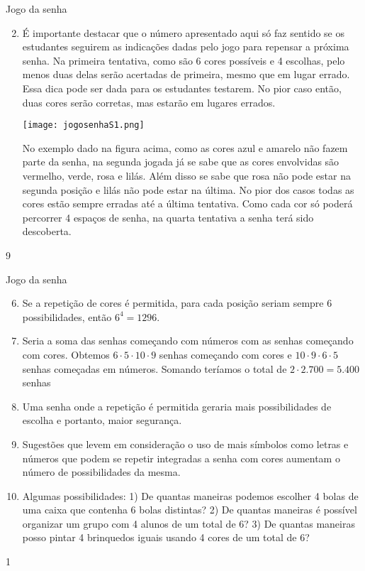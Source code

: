 \begin{answer}{Jogo da senha}
{
\begin{enumerate}\setcounter{enumi}{1}
\item É importante destacar que o número apresentado aqui só faz sentido se os estudantes seguirem as indicações dadas pelo jogo para repensar a próxima senha. 
Na primeira tentativa, como são 6 cores possíveis e 4 escolhas, pelo menos duas delas serão acertadas de primeira, mesmo que em lugar errado. Essa dica pode ser dada para os estudantes testarem. No pior caso então, duas cores serão corretas, mas estarão em lugares errados.

\begin{center}
\texttt{[image: jogosenhaS1.png]}
\end{center}
No exemplo dado na figura acima, como as cores azul e amarelo não fazem parte da senha, na segunda jogada já se sabe que as cores envolvidas são vermelho, verde, rosa e lilás. Além disso se sabe que rosa não pode estar na segunda posição e lilás não pode estar na última. No pior dos casos todas as cores estão sempre erradas até a última tentativa. Como cada cor só poderá percorrer 4 espaços de senha, na quarta tentativa a senha terá sido descoberta. 
\end{enumerate}
}{9}
\end{answer}
\clearmargin
\begin{answer}{Jogo da senha}
{
\begin{enumerate}\setcounter{enumi}{5}
\item Se a repetição de cores é permitida, para cada posição seriam sempre 6 possibilidades, então $6^4=1296.$

\item Seria a soma das senhas começando com números com as senhas começando com cores. Obtemos  $6 \cdot 5 \cdot  10 \cdot 9 $ senhas começando com cores e $10 \cdot 9 \cdot 6 \cdot 5$ senhas começadas em números. Somando teríamos o total de $2 \cdot 2.700= 5.400$ senhas 

\item Uma senha onde a repetição é permitida geraria mais possibilidades de escolha e portanto, maior segurança.

\item Sugestões que levem em consideração o uso de mais símbolos como letras e números que podem se repetir integradas a senha com cores  aumentam o número de possibilidades da mesma.

\item Algumas possibilidades: 1) De quantas maneiras podemos escolher 4 bolas de uma caixa que contenha 6 bolas distintas? 2) De quantas maneiras é possível organizar um grupo com 4 alunos de um total de 6? 3) De quantas maneiras posso pintar 4 brinquedos iguais usando 4 cores de um total de 6?
\end{enumerate}
}{1}
\end{answer}

